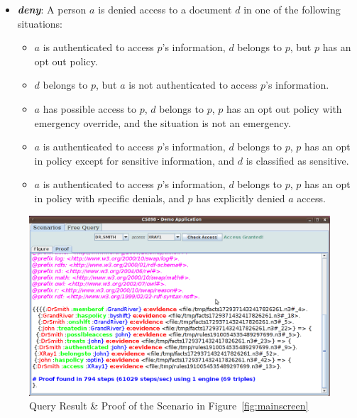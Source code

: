 \documentclass[conference]{IEEEtran}
\begin{document}
\begin{itemize}
\item \textbf{\textit{deny}}: A person $a$ is denied access to a document $d$ in one of the following situations:
\begin{itemize}
 \item $a$ is authenticated to access $p$'s information, $d$ belongs to $p$, but $p$ has an opt out policy.
\item $d$ belongs to $p$, but $a$ is not authenticated to access $p$'s information.
\item $a$ has possible access to $p$, $d$ belongs to $p$, $p$ has an opt out policy with emergency override, and the situation is not an emergency.
\item $a$ is authenticated to access $p$'s information, $d$ belongs to $p$, $p$ has an opt in policy except for sensitive information, and $d$ is classified as
sensitive.
\item $a$ is authenticated to access $p$'s information, $d$ belongs to $p$, $p$ has an opt in policy with specific denials, and $p$ has explicitly denied $a$
access.
\end{itemize}

\end{itemize}

\begin{figure}[!t]
 \centering
 \includegraphics[scale=0.25,keepaspectratio=true]{./proof.png}
 \caption{Query Result \& Proof of the Scenario in Figure~\ref{fig:mainscreen}}
 \label{fig:proof}
\end{figure}
\end{document}
